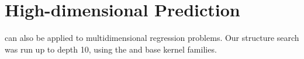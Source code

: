 




\section{High-dimensional Prediction}

\procedurename{} can also be applied to multidimensional regression problems.
%
Our structure search was run up to depth 10, using the \SE{} and \RQ{} base kernel families.





